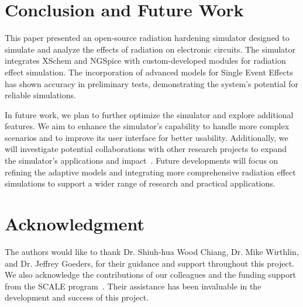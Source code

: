 \documentclass[conference]{IEEEtran}
\begin{document}
    \section{Conclusion and Future Work}\label{sec:conclusion-and-future-work}
    This paper presented an open-source radiation hardening simulator designed to simulate and analyze the effects of radiation on electronic circuits.
    The simulator integrates XSchem and NGSpice with custom-developed modules for radiation effect simulation.
    The incorporation of advanced models for Single Event Effects has shown accuracy in preliminary tests, demonstrating the system's potential for reliable simulations.

    In future work, we plan to further optimize the simulator and explore additional features.
    We aim to enhance the simulator's capability to handle more complex scenarios and to improve its user interface for better usability.
    Additionally, we will investigate potential collaborations with other research projects to expand the simulator's applications and impact~\cite{Pepper1990}.
    Future developments will focus on refining the adaptive models and integrating more comprehensive radiation effect simulations to support a wider range of research and practical applications.

    \section*{Acknowledgment}
    The authors would like to thank Dr. Shiuh-hua Wood Chiang, Dr. Mike Wirthlin, and Dr. Jeffrey Goeders, for their guidance and support throughout this project.
    We also acknowledge the contributions of our colleagues and the funding support from the SCALE program~\cite{SCALE}.
    Their assistance has been invaluable in the development and success of this project.

    
    
\end{document}
